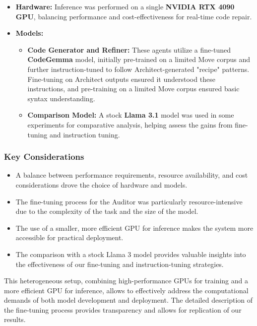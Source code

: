 \begin{itemize}[leftmargin=*]
    \item \textbf{Hardware:} Inference was performed on a single \textbf{NVIDIA RTX 4090 GPU}, balancing performance and cost-effectiveness for real-time code repair.
    \item \textbf{Models:}
    \begin{itemize}
        \item \textbf{Code Generator and Refiner:} These agents utilize a fine-tuned \textbf{CodeGemma} model, initially pre-trained on a limited Move corpus and further instruction-tuned to follow Architect-generated "recipe" patterns. Fine-tuning on Architect outputs ensured it understood these instructions, and pre-training on a limited Move corpus ensured basic syntax understanding.
        \item \textbf{Comparison Model:} A stock \textbf{Llama 3.1} model was used in some experiments for comparative analysis, helping assess the gains from fine-tuning and instruction tuning.
    \end{itemize}
\end{itemize}

\subsubsection{Key Considerations}

\begin{itemize}[leftmargin=*]
    \item A balance between performance requirements, resource availability, and cost considerations drove the choice of hardware and models.
    \item The fine-tuning process for the Auditor was particularly resource-intensive due to the complexity of the task and the size of the model.
    \item The use of a smaller, more efficient GPU for inference makes the system more accessible for practical deployment.
    \item The comparison with a stock Llama 3 model provides valuable insights into the effectiveness of our fine-tuning and instruction-tuning strategies.
\end{itemize}

This heterogeneous setup, combining high-performance GPUs for training and a more efficient GPU for inference, allows \sln{} to effectively address the computational demands of both model development and deployment. The detailed description of the fine-tuning process provides transparency and allows for replication of our results.